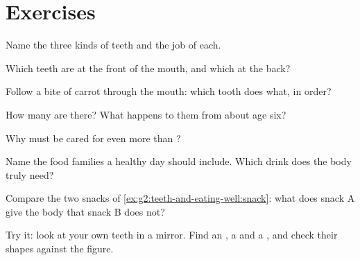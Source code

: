 \section{Exercises}

\begin{exercise}[$\star$]\label{exo:g2:teeth-and-eating-well:1}
Name the three kinds of teeth and the job of each.
\end{exercise}

\begin{exercise}[$\star$]\label{exo:g2:teeth-and-eating-well:2}
Which teeth are at the front of the mouth, and which at the back?
\end{exercise}

\begin{exercise}[$\star$]\label{exo:g2:teeth-and-eating-well:3}
Follow a bite of carrot through the mouth: which tooth does what,
in order?
\end{exercise}

\begin{exercise}[$\star$]\label{exo:g2:teeth-and-eating-well:4}
How many  are there? What happens to them from about
age six?
\end{exercise}

\begin{exercise}[$\star$]\label{exo:g2:teeth-and-eating-well:5}
Why must  be cared for even more than ?
\end{exercise}

\begin{exercise}[$\star$]\label{exo:g2:teeth-and-eating-well:6}
Name the food families a healthy day should include. Which drink
does the body truly need?
\end{exercise}

\begin{exercise}[$\star$]\label{exo:g2:teeth-and-eating-well:7}
Compare the two snacks of \cref{ex:g2:teeth-and-eating-well:snack}:
what does snack A give the body that snack B does not?
\end{exercise}

\begin{exercise}[$\star$]\label{exo:g2:teeth-and-eating-well:8}
Try it: look at your own teeth in a mirror. Find an , a
 and a , and check their shapes against the figure.
\end{exercise}

